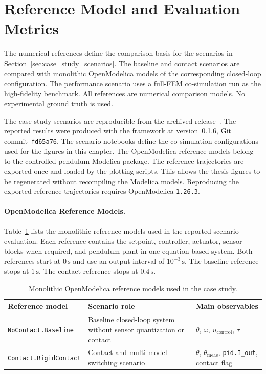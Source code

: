 \section{Reference Model and Evaluation Metrics}
\label{sec:case_study_reference_metrics}

The numerical references define the comparison basis for the scenarios in Section~\ref{sec:case_study_scenarios}.
The baseline and contact scenarios are compared with monolithic OpenModelica models of the corresponding closed-loop configuration.
The performance scenario uses a full-\ac{FEM} co-simulation run as the high-fidelity benchmark.
All references are numerical comparison models.
No experimental ground truth is used.

The case-study scenarios are reproducible from the archived \syssimx{} release~\cite{frech_syssimx_2026}.
The reported results were produced with the framework at version~0.1.6, Git commit~\texttt{fd65a76}.
The scenario notebooks define the co-simulation configurations used for the figures in this chapter.
The OpenModelica reference models belong to the controlled-pendulum Modelica package.
The reference trajectories are exported once and loaded by the plotting scripts.
This allows the thesis figures to be regenerated without recompiling the Modelica models.
Reproducing the exported reference trajectories requires OpenModelica \texttt{1.26.3}.

\paragraph{OpenModelica Reference Models.}
Table~\ref{tab:case_reference_models} lists the monolithic reference models used in the reported scenario evaluation.
Each reference contains the setpoint, controller, actuator, sensor blocks when required, and pendulum plant in one equation-based system.
Both references start at $0\,\mathrm{s}$ and use an output interval of $10^{-3}\,\mathrm{s}$.
The baseline reference stops at $1\,\mathrm{s}$.
The contact reference stops at $0.4\,\mathrm{s}$.

\begin{table}[tbp]
  \centering
  \small
  \caption[Monolithic OpenModelica reference models]{Monolithic OpenModelica reference models used in the case study.}
  \label{tab:case_reference_models}
  \begin{tabular}{p{4.0cm} p{5.0cm} p{5.2cm}}
    \toprule
    \textbf{Reference model} & \textbf{Scenario role} & \textbf{Main observables} \\
    \midrule
    \texttt{NoContact.Baseline}
      & Baseline closed-loop system without sensor quantization or contact
      & $\theta$, $\omega$, $u_{\mathrm{control}}$, $\tau$ \\
    \addlinespace
    \texttt{Contact.RigidContact}
      & Contact and multi-model switching scenario
      & $\theta$, $\theta_{\mathrm{meas}}$, \texttt{pid.I\_out}, contact flag \\
    \bottomrule
  \end{tabular}
\end{table}

